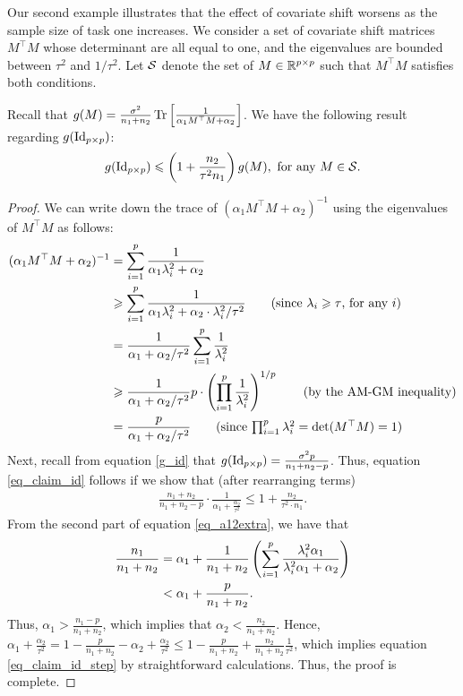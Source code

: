 Our second example illustrates that the effect of covariate shift worsens as the sample size of task one increases.
We consider a set of covariate shift matrices $M^{\top} M$ whose determinant are all equal to one, and the eigenvalues are bounded between $\tau^2$ and $1 / \tau^2$.
Let $\mathcal{S}$ denote the set of $M\in\mathbb{R}^{p\times p}$ such that $M^{\top} M$ satisfies both conditions.
\begin{claim}\label{prop_covariate}
    Recall that $g(M) = \frac{\sigma^2}{n_1 + n_2} \operatorname{Tr}\left[\frac 1 {\alpha_1 M^{\top} M + \alpha_2}\right]$.
	We have the following result regarding $g(\operatorname{Id}_{p \times p})$:
	\begin{align} g(\id_{p\times p}) \le \bigbrace{1+ {\frac{n_2}{\tau^2 n_1}  }} g(M), \text{ for any } M \in \cS. \label{eq_claim_id}
	\end{align}
\end{claim}
\begin{proof}
    We can write down the trace of $(\alpha_1 M^{\top} M + \alpha_2)^{-1}$ using the eigenvalues of $M^{\top} M$ as follows:
    \begin{align*}
        (\alpha_1 M^{\top} M + \alpha_2)^{-1} &= \sum_{i=1}^p \frac{1} {\alpha_1 \lambda_i^2 + \alpha_2} \\
        &\ge \sum_{i=1}^p \frac{1} {\alpha_1 \lambda_i^2 + \alpha_2 \cdot {\lambda_i^2} / {\tau^2}} \tag{since $\lambda_i \ge \tau$, for any $i$} \\
        &= \frac 1 {\alpha_1 + \alpha_2 / \tau^2} \sum_{i=1}^ p \frac 1 {\lambda_i^2} \\
        &\ge \frac 1 {\alpha_1 + \alpha_2 /\tau^2} p\cdot \bigbrace{\prod_{i=1}^p \frac 1 {\lambda_i^2}}^{1/ p} \tag{by the AM-GM inequality} \\
        &= \frac{p}{\alpha_1 + \alpha_2 / \tau^2} \tag{since $\prod_{i=1}^p \lambda_i^2 = \det(M^{\top} M) = 1$}
    \end{align*}
    Next, recall from equation \eqref{g_id} that
    $g(\operatorname{Id}_{p\times p}) = \frac{\sigma^2 p}{n_1 + n_2 - p}$.
    Thus, equation \eqref{eq_claim_id} follows if we show that (after rearranging terms)
    \begin{align}
        \frac{n_1 + n_2}{n_1 + n_2 - p} \cdot \frac 1 {\alpha_1 + \frac{\alpha_2}{\tau^2}} \le 1 + \frac{n_2}{\tau^2 \cdot n_1}. \label{eq_claim_id_step}
    \end{align}
    From the second part of equation \eqref{eq_a12extra}, we have that
    \begin{align*}
        \frac{n_1} {n_1 + n_2} &= \alpha_1 + \frac 1 {n_1 + n_2} \bigbrace{\sum_{i=1}^p \frac{\lambda_i^2\alpha_1}{\lambda_i^2\alpha_1 + \alpha_2}} \\
        &< \alpha_1 + \frac p {n_1 + n_2}.
    \end{align*}
    Thus, $\alpha_1 > \frac{n_1 - p}{n_1 + n_2}$, which implies that $\alpha_2 < \frac{n_2}{n_1 + n_2}$.
    Hence, $\alpha_1 + \frac{\alpha_2}{\tau^2} = 1 - \frac{p}{n_1 + n_2} - \alpha_2 + \frac{\alpha_2}{\tau^2} \le 1 - \frac{p}{n_1 + n_2} + \frac{n_2}{n_1 + n_2} \frac 1 {\tau^2}$, which implies
    equation \eqref{eq_claim_id_step} by straightforward calculations.
    Thus, the proof is complete.
\end{proof}
